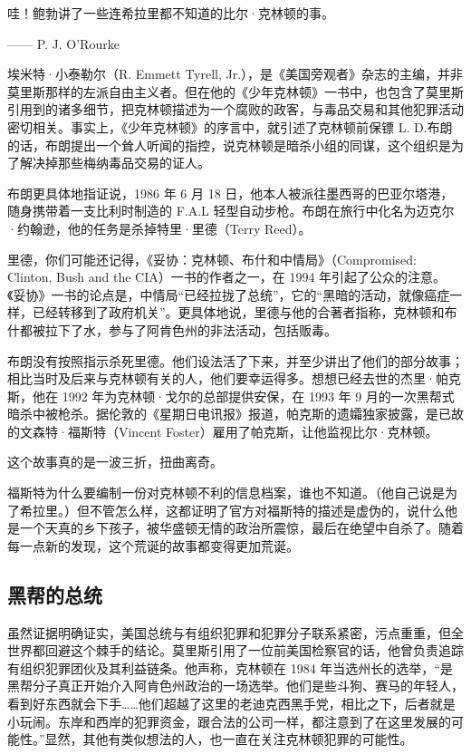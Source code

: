 \begin{tcolorbox}
\kaishu 哇！鲍勃讲了一些连希拉里都不知道的比尔·克林顿的事。
\begin{flushright}
—— P. J. O’Rourke
\end{flushright}
\end{tcolorbox}

埃米特·小泰勒尔（R. Emmett Tyrell, Jr.），是《美国旁观者》杂志的主编，并非莫里斯那样的左派自由主义者。但在他的《少年克林顿》一书中，也包含了莫里斯引用到的诸多细节，把克林顿描述为一个腐败的政客，与毒品交易和其他犯罪活动密切相关。事实上，《少年克林顿》的序言中，就引述了克林顿前保镖 L. D.布朗的话，布朗提出一个耸人听闻的指控，说克林顿是暗杀小组的同谋，这个组织是为了解决掉那些梅纳毒品交易的证人。

布朗更具体地指证说，1986 年 6 月 18 日，他本人被派往墨西哥的巴亚尔塔港，随身携带着一支比利时制造的 F.A.L 轻型自动步枪。布朗在旅行中化名为迈克尔·约翰逊，他的任务是杀掉特里·里德（Terry Reed）。

里德，你们可能还记得，《妥协：克林顿、布什和中情局》（Compromised: Clinton, Bush and the CIA）一书的作者之一，在 1994 年引起了公众的注意。《妥协》一书的论点是，中情局“已经拉拢了总统”，它的“黑暗的活动，就像癌症一样，已经转移到了政府机关”。更具体地说，里德与他的合著者指称，克林顿和布什都被拉下了水，参与了阿肯色州的非法活动，包括贩毒。

布朗没有按照指示杀死里德。他们设法活了下来，并至少讲出了他们的部分故事；相比当时及后来与克林顿有关的人，他们要幸运得多。想想已经去世的杰里·帕克斯，他在 1992 年为克林顿·戈尔的总部提供安保，在 1993 年 9 月的一次黑帮式暗杀中被枪杀。据伦敦的《星期日电讯报》报道，帕克斯的遗孀独家披露，是已故的文森特·福斯特（Vincent Foster）雇用了帕克斯，让他监视比尔·克林顿。

这个故事真的是一波三折，扭曲离奇。

福斯特为什么要编制一份对克林顿不利的信息档案，谁也不知道。（他自己说是为了希拉里。）但不管怎么样，这都证明了官方对福斯特的描述是虚伪的，说什么他是一个天真的乡下孩子，被华盛顿无情的政治所震惊，最后在绝望中自杀了。随着每一点新的发现，这个荒诞的故事都变得更加荒诞。

\subsection{黑帮的总统}
虽然证据明确证实，美国总统与有组织犯罪和犯罪分子联系紧密，污点重重，但全世界都回避这个棘手的结论。莫里斯引用了一位前美国检察官的话，他曾负责追踪有组织犯罪团伙及其利益链条。他声称，克林顿在 1984 年当选州长的选举，“是黑帮分子真正开始介入阿肯色州政治的一场选举。他们是些斗狗、赛马的年轻人，看到好东西就会下手……他们超越了这里的老迪克西黑手党，相比之下，后者就是小玩闹。东岸和西岸的犯罪资金，跟合法的公司一样，都注意到了在这里发展的可能性。”显然，其他有类似想法的人，也一直在关注克林顿犯罪的可能性。


